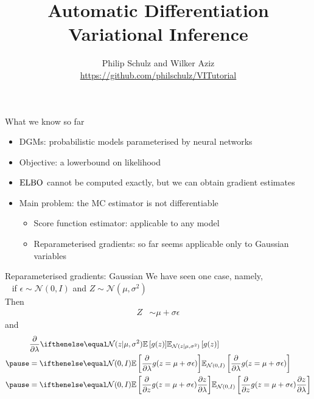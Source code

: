 \documentclass[14pt]{beamer}
\title{Automatic Differentiation Variational Inference}
\author{Philip Schulz and Wilker Aziz\\
\url{https://github.com/philschulz/VITutorial}}
\date{}
\begin{document}
\begin{frame}
\maketitle
\end{frame}

\begin{frame}{What we know so far}
    \begin{itemize}
        \item DGMs: probabilistic models parameterised by neural networks \pause
        \item Objective: a lowerbound on likelihood \pause
        \item $ \operatorname{ELBO}$ cannot be computed exactly, but we can obtain gradient estimates \pause
        \item Main problem: the MC estimator is not differentiable \pause
        \begin{itemize}
        		\item Score function estimator: applicable to any model  \pause
		\item Reparameterised gradients: so far seems applicable only to Gaussian variables
        \end{itemize}
    \end{itemize}
\end{frame}

\begin{frame}{Reparameterised gradients: Gaussian}
	We have  seen one case, namely,\\
	~ if $\epsilon \sim \mathcal N(0, I)$ and $Z \sim \mathcal N(\mu,\sigma^2)$\pause\\
	Then
	\begin{equation*}
	\begin{aligned}
		Z &\sim \mu +  \sigma  \epsilon
	\end{aligned}
	\end{equation*}
	and
	\begin{equation*}
	\begin{aligned}
		&\pdv{\lambda} \E[\mathcal N(z|\mu, \sigma^2)]{ g(z) }\\ \pause
		&= \E[\mathcal N(0, I)]{\pdv{\lambda} g(z = \mu + \sigma  \epsilon)} \\ \pause
		&= \E[\mathcal N(0, I)]{\pdv{z} g(z = \mu + \sigma  \epsilon) \pdv{z}{\lambda}}
	\end{aligned}
	\end{equation*}
\end{frame}
\end{document}
